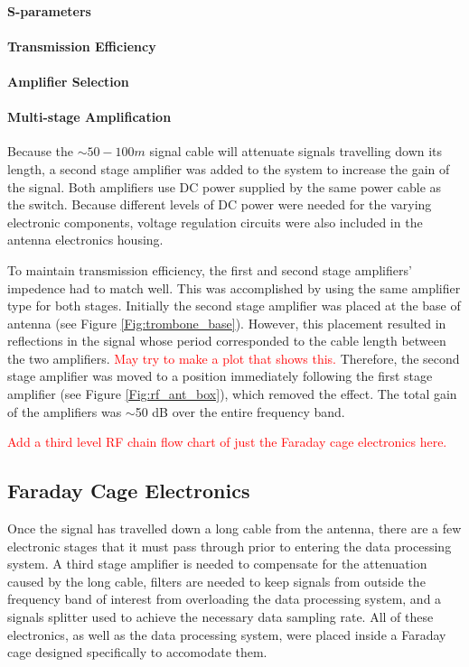\paragraph{S-parameters}

\paragraph{Transmission Efficiency}

\paragraph{Amplifier Selection}

\paragraph{Multi-stage Amplification}
Because the $\sim50-100 m$ signal cable will attenuate signals travelling down its length, a second stage amplifier was added to the system to increase the gain of the signal. Both amplifiers use DC power supplied by the same power cable as the switch. Because different levels of DC power were needed for the varying electronic components, voltage regulation circuits were also included in the antenna electronics housing. 

To maintain transmission efficiency, the first and second stage amplifiers' impedence had to match well. This was accomplished by using the same amplifier type for both stages. Initially the second stage amplifier was placed at the base of antenna (see Figure \ref{Fig:trombone_base}). However, this placement resulted in reflections in the signal whose period corresponded to the cable length between the two amplifiers. \textcolor{red}{May try to make a plot that shows this.} Therefore, the second stage amplifier was moved to a position immediately following the first stage amplifier (see Figure \ref{Fig:rf_ant_box}), which removed the effect. The total gain of the amplifiers was $\sim$50 dB over the entire frequency band. 

\textcolor{red}{Add a third level RF chain flow chart of just the Faraday cage electronics here.}

\subsection{Faraday Cage Electronics}
Once the signal has travelled down a long cable from the antenna, there are a few electronic stages that it must pass through prior to entering the data processing system. A third stage amplifier is needed to compensate for the attenuation caused by the long cable, filters are needed to keep signals from outside the frequency band of interest from overloading the data processing system, and a signals splitter used to achieve the necessary data sampling rate. All of these electronics, as well as the data processing system, were placed inside a Faraday cage designed specifically to accomodate them. 

